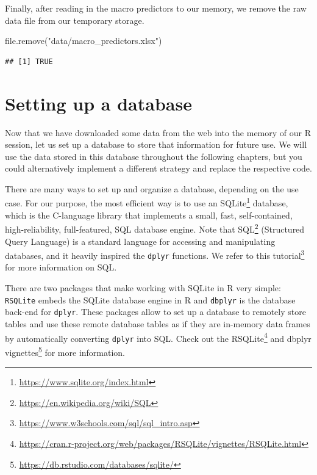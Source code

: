 \documentclass[
]{krantz}
\newenvironment{Shaded}{\begin{snugshade}}{\end{snugshade}}
\newcommand{\FunctionTok}[1]{\textcolor[rgb]{0,0,0}{#1}}
\newcommand{\NormalTok}[1]{#1}
\newcommand{\StringTok}[1]{\textcolor[rgb]{0.5,0.5,0.5}{#1}}
\renewcommand{\href}[2]{#2\footnote{\url{#1}}}
\begin{document}
Finally, after reading in the macro predictors to our memory, we remove the raw data file from our temporary storage.

\begin{Shaded}
\begin{Highlighting}[]
\FunctionTok{file.remove}\NormalTok{(}\StringTok{"data/macro\_predictors.xlsx"}\NormalTok{)}
\end{Highlighting}
\end{Shaded}

\begin{verbatim}
## [1] TRUE
\end{verbatim}

\hypertarget{setting-up-a-database}{%
\section{Setting up a database}\label{setting-up-a-database}}

Now that we have downloaded some data from the web into the memory of our R session, let us set up a database to store that information for future use. We will use the data stored in this database throughout the following chapters, but you could alternatively implement a different strategy and replace the respective code.

There are many ways to set up and organize a database, depending on the use case. For our purpose, the most efficient way is to use an \href{https://www.sqlite.org/index.html}{SQLite} database, which is the C-language library that implements a small, fast, self-contained, high-reliability, full-featured, SQL database engine. Note that \href{https://en.wikipedia.org/wiki/SQL}{SQL} (Structured Query Language) is a standard language for accessing and manipulating databases, and it heavily inspired the \texttt{dplyr} functions. We refer to \href{https://www.w3schools.com/sql/sql_intro.asp}{this tutorial} for more information on SQL.

There are two packages that make working with SQLite in R very simple: \texttt{RSQLite} embeds the SQLite database engine in R and \texttt{dbplyr} is the database back-end for \texttt{dplyr}. These packages allow to set up a database to remotely store tables and use these remote database tables as if they are in-memory data frames by automatically converting \texttt{dplyr} into SQL. Check out the \href{https://cran.r-project.org/web/packages/RSQLite/vignettes/RSQLite.html}{RSQLite} and \href{https://db.rstudio.com/databases/sqlite/}{dbplyr vignettes} for more information.
\end{document}
